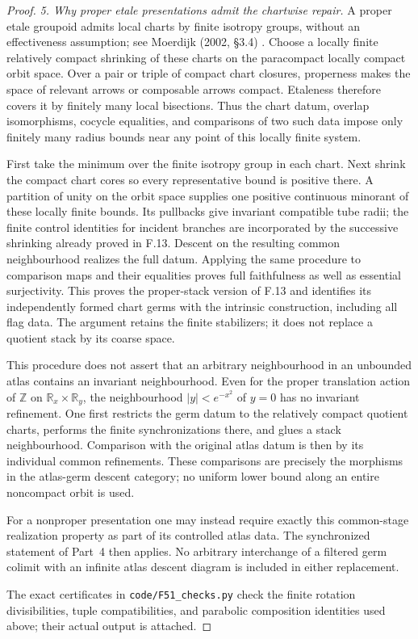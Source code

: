 \begin{proof}
\emph{5. Why proper etale presentations admit the chartwise repair.}
A proper etale groupoid admits local charts by finite isotropy
groups, without an effectiveness assumption; see Moerdijk (2002,
\S3.4) \cite{FA_Moerdijk2002}. Choose a locally finite relatively
compact shrinking of these charts on the paracompact locally
compact orbit space. Over a pair or triple of compact chart
closures, properness makes the space of relevant arrows or
composable arrows compact. Etaleness therefore covers it by
finitely many local bisections. Thus the chart datum, overlap
isomorphisms, cocycle equalities, and comparisons of two such data
impose only finitely many radius bounds near any point of this
locally finite system.

First take the minimum over the finite isotropy group in each
chart. Next shrink the compact chart cores so every representative
bound is positive there. A partition of unity on the orbit space
supplies one positive continuous minorant of these locally finite
bounds. Its pullbacks give invariant compatible tube radii; the
finite control identities for incident branches are incorporated
by the successive shrinking already proved in F.13. Descent on
the resulting common neighbourhood realizes the full datum.
Applying the same procedure to comparison maps and their
equalities proves full faithfulness as well as essential
surjectivity. This proves the proper-stack version of F.13 and
identifies its independently formed chart germs with the intrinsic
construction, including all flag data. The argument retains the
finite stabilizers; it does not replace a quotient stack by its
coarse space.

This procedure does not assert that an arbitrary neighbourhood in
an unbounded atlas contains an invariant neighbourhood. Even for
the proper translation action of $\mathbb Z$ on
$\mathbb R_x\times\mathbb R_y$, the neighbourhood
$|y|<e^{-x^2}$ of $y=0$ has no invariant refinement. One first
restricts the germ datum to the relatively compact quotient charts,
performs the finite synchronizations there, and glues a stack
neighbourhood. Comparison with the original atlas datum is then by
its individual common refinements. These comparisons are precisely
the morphisms in the atlas-germ descent category; no uniform lower
bound along an entire noncompact orbit is used.

For a nonproper presentation one may instead require exactly this
common-stage realization property as part of its controlled atlas
data. The synchronized statement of Part~4 then applies. No
arbitrary interchange of a filtered germ colimit with an infinite
atlas descent diagram is included in either replacement.

The exact certificates in \texttt{code/F51\_checks.py} check the finite
rotation divisibilities, tuple compatibilities, and parabolic composition
identities used above; their actual output is attached.
\end{proof}
